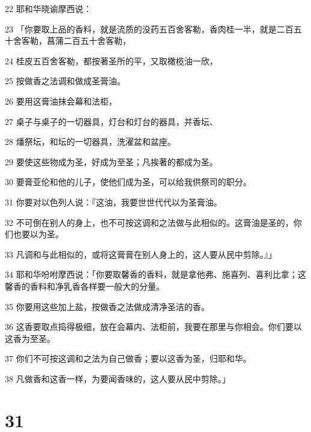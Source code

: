 \par 22 耶和华晓谕摩西说：
\par 23 「你要取上品的香料，就是流质的没药五百舍客勒，香肉桂一半，就是二百五十舍客勒，菖蒲二百五十舍客勒，
\par 24 桂皮五百舍客勒，都按著圣所的平，又取橄榄油一欣，
\par 25 按做香之法调和做成圣膏油。
\par 26 要用这膏油抹会幕和法柜，
\par 27 桌子与桌子的一切器具，灯台和灯台的器具，并香坛、
\par 28 燔祭坛，和坛的一切器具，洗濯盆和盆座。
\par 29 要使这些物成为圣，好成为至圣；凡挨著的都成为圣。
\par 30 要膏亚伦和他的儿子，使他们成为圣，可以给我供祭司的职分。
\par 31 你要对以色列人说：『这油，我要世世代代以为圣膏油。
\par 32 不可倒在别人的身上，也不可按这调和之法做与此相似的。这膏油是圣的，你们也要以为圣。
\par 33 凡调和与此相似的，或将这膏膏在别人身上的，这人要从民中剪除。』」
\par 34 耶和华吩咐摩西说：「你要取馨香的香料，就是拿他弗、施喜列、喜利比拿；这馨香的香料和净乳香各样要一般大的分量。
\par 35 你要用这些加上盐，按做香之法做成清净圣洁的香。
\par 36 这香要取点捣得极细，放在会幕内、法柜前，我要在那里与你相会。你们要以这香为至圣。
\par 37 你们不可按这调和之法为自己做香；要以这香为圣，归耶和华。
\par 38 凡做香和这香一样，为要闻香味的，这人要从民中剪除。」

\chapter{31}

